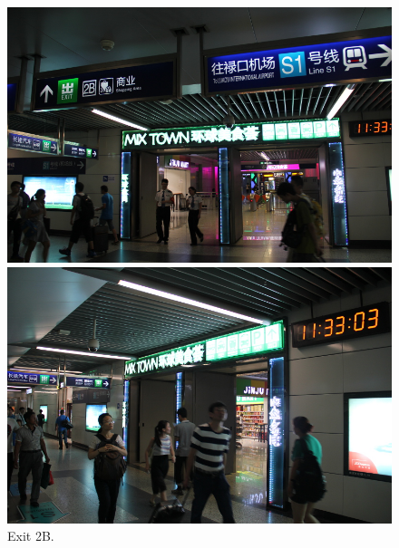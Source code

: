 \documentclass[11pt]{article}
\begin{document}
 \begin{figure}[!h]
	\begin{minipage}[t]{.5\textwidth}
     	\centering
        	\includegraphics[scale=0.27]{IMG_7186.jpg}
	\end{minipage}%
     \begin{minipage}[t]{.5\textwidth}
         \centering
         \includegraphics[scale=0.27]{IMG_7182.jpg}
    \end{minipage}%
    	\caption{Exit 2B.\label{IMG_7182}}
 \end{figure}
\end{document}

